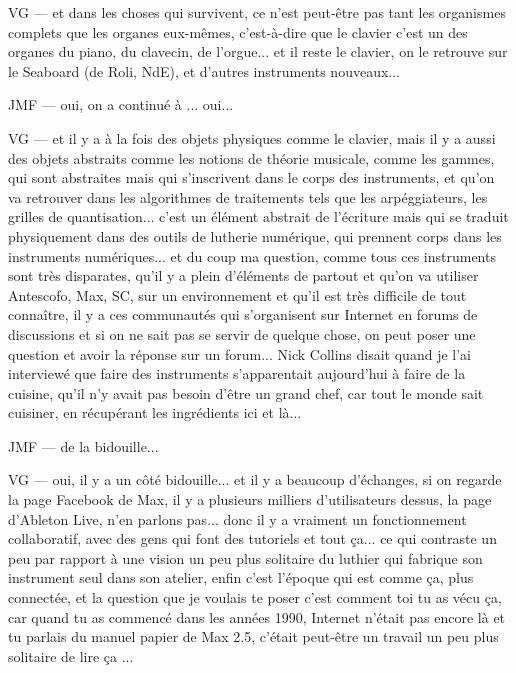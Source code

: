 VG — et dans les choses qui survivent, ce n'est peut-être pas tant les organismes complets que les organes eux-mêmes, c'est-à-dire que le clavier c'est un des organes du piano, du clavecin, de l'orgue... et il reste le clavier, on le retrouve sur le Seaboard (de Roli, NdE), et d'autres instruments nouveaux... 

JMF — oui, on a continué à ... oui... 

VG — et il y a à la fois des objets physiques comme le clavier, mais il y a aussi des objets abstraits comme les notions de théorie musicale, comme les gammes, qui sont abstraites mais qui s'inscrivent dans le corps des instruments, et qu'on va retrouver dans les algorithmes de traitements tels que les arpéggiateurs, les grilles de quantisation... c'est un élément abstrait de l'écriture mais qui se traduit physiquement dans des outils de lutherie numérique, qui prennent corps dans les instruments numériques... et du coup ma question, comme tous ces instruments sont très disparates, qu'il y a plein d'éléments de partout et qu'on va utiliser Antescofo, Max, SC, sur un environnement et qu'il est très difficile de tout connaître, il y a ces communautés qui s'organisent sur Internet en forums de discussions et si on ne sait pas se servir de quelque chose, on peut poser une question et avoir la réponse sur un forum... Nick Collins disait quand je l'ai interviewé que faire des instruments s'apparentait aujourd'hui à faire de la cuisine, qu'il n'y avait pas besoin d'être un grand chef, car tout le monde sait cuisiner, en récupérant les ingrédients ici et là... 

JMF — de la bidouille... 

VG — oui, il y a un côté bidouille... et il y a beaucoup d'échanges, si on regarde la page Facebook de Max, il y a plusieurs milliers d'utilisateurs dessus, la page d'Ableton Live, n'en parlons pas... donc il y a vraiment un fonctionnement collaboratif, avec des gens qui font des tutoriels et tout ça... ce qui contraste un peu par rapport à une vision un peu plus solitaire du luthier qui fabrique son instrument seul dans son atelier, enfin c'est l'époque qui est comme ça, plus connectée, et la question que je voulais te poser c'est comment toi tu as vécu ça, car quand tu as commencé dans les années 1990, Internet n'était pas encore là et tu parlais du manuel papier de Max 2.5, c'était peut-être un travail un peu plus solitaire de lire ça ... 

